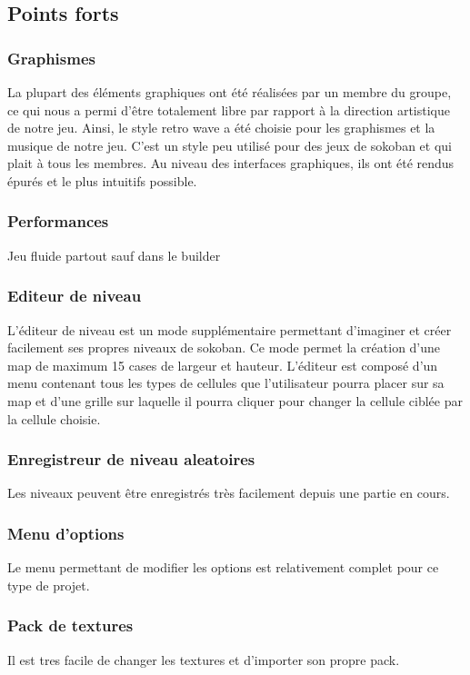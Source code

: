 \documentclass[../main.tex]{subfiles}
\begin{document}
\subsection{Points forts}
\subsubsection{Graphismes}
La plupart des éléments graphiques ont été réalisées par un membre du groupe, ce qui nous a permi d'être totalement libre
par rapport à la direction artistique de notre jeu.
Ainsi, le style retro wave a été choisie pour les graphismes et la musique de notre jeu.
C'est un style peu utilisé pour des jeux de sokoban et qui plait à tous les membres.
Au niveau des interfaces graphiques, ils ont été rendus épurés et le plus intuitifs possible.	

\subsubsection{Performances}
Jeu fluide partout sauf dans le builder

\subsubsection{Editeur de niveau}
L'éditeur de niveau est un mode supplémentaire permettant d'imaginer et créer facilement ses propres niveaux de sokoban.
Ce mode permet la création d'une map de maximum 15 cases de largeur et hauteur. 
L'éditeur est composé d'un menu contenant tous les types de cellules que l'utilisateur pourra placer sur sa map et d'une grille sur laquelle
il pourra cliquer pour changer la cellule ciblée par la cellule choisie.

\subsubsection{Enregistreur de niveau aleatoires}
Les niveaux peuvent être enregistrés très facilement depuis une partie en cours.

\subsubsection{Menu d'options}
Le menu permettant de modifier les options est relativement complet pour ce type de projet.

\subsubsection{Pack de textures}
Il est tres facile de changer les textures et d'importer son propre pack.
\end{document}
